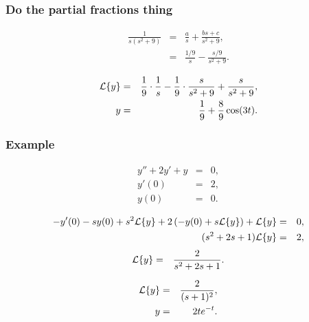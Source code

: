 \begin{frame}
  \frametitle{Do the partial fractions thing}

  \begin{eqnarray*}
    \frac{1}{s(s^2+9)} & = & \frac{a}{s} + \frac{bs+c}{s^2+9}, \\
    & = & \frac{1/9}{s} - \frac{s/9}{s^2+9}.
  \end{eqnarray*}

  {
    \begin{eqnarray*}
      \laplace{y} & = & \frac{1}{9}\cdot\frac{1}{s} - \frac{1}{9}\cdot\frac{s}{s^2+9}+\frac{s}{s^2+9}, \\
      y & = & \frac{1}{9} + \frac{8}{9}\cos(3t).
    \end{eqnarray*}
  }

\end{frame}



\begin{frame}
  \frametitle{Example}

  \begin{eqnarray*}
    y''  + 2y' + y & = & 0, \\
    y'(0) & = & 2, \\
    y(0) & = & 0.
  \end{eqnarray*}

  {
    \begin{eqnarray*}
      -y'(0) - s y(0) + s^2 \laplace{y} + 2 \lp -y(0) + s\laplace{y} \rp + \laplace{y} & = & 0, \\
      (s^2+2s+1) \laplace{y} & = & 2,
    \end{eqnarray*}
    \begin{eqnarray*}
      \laplace{y} & = & \frac{2}{s^2+2s+1}.
    \end{eqnarray*}
  }

  {
    \begin{eqnarray*}
      \laplace{y} & = & \frac{2}{(s+1)^2}, \\
      y & = & 2 t e^{-t}.
    \end{eqnarray*}
  }

\end{frame}





